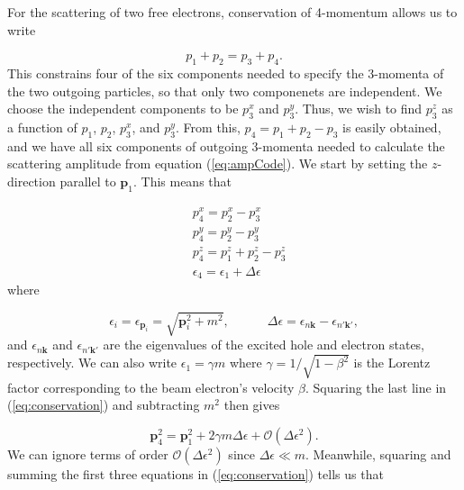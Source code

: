 \documentclass{article}
\begin{document}
For the scattering of two free electrons, conservation of 4-momentum allows us
to write

\begin{equation}
    p_1 + p_2 = p_3 + p_4.
\end{equation}
%
This constrains four of the six components needed to specify the 3-momenta of the
two outgoing particles, so that only two componenets are independent.
We choose the independent components to be $p^x_3$ and $p^y_3$.  Thus, we wish
to find $p^z_3$ as a function of $p_1$, $p_2$, $p^x_3$, and $p^y_3$.
From this, $p_4 = p_1 + p_2 - p_3$ is easily obtained, and we have all six
components of outgoing 3-momenta needed to calculate the scattering amplitude
from equation (\ref{eq:ampCode}).
We start by setting the $z$-direction parallel to $\mathbf{p}_1$.
This means that

\begin{equation}
\label{eq:conservation}
    \begin{aligned}
        &p^x_4 = p^x_2 - p^x_3
        \\&p^y_4 = p^y_2 - p^y_3
        \\&p^z_4 = p^z_1 + p^z_2 - p^z_3
        \\&\epsilon_4 = \epsilon_1 + \Delta\epsilon
    \end{aligned}
\end{equation}
%
where

\begin{equation}
  \epsilon_i = \epsilon_{\mathbf{p}_i} = \sqrt{\mathbf{p}_i^2 + m^2},
  \qquad\quad
  \Delta\epsilon = \epsilon_{n\mathbf{k}} - \epsilon_{n'\mathbf{k'}},
\end{equation}
%
and $\epsilon_{n\mathbf{k}}$ and $\epsilon_{n'\mathbf{k'}}$ are the eigenvalues
of the excited hole and electron states, respectively.
We can also write $\epsilon_1 = \gamma m$ where $\gamma=1/\sqrt{1-\beta^2}$ is
the Lorentz factor corresponding to the beam electron's velocity $\beta$.
Squaring the last line in (\ref{eq:conservation}) and subtracting $m^2$ then
gives

\begin{equation}
  \mathbf{p}_4^2
  =
  \mathbf{p}_1^2 + 2\gamma m\Delta\epsilon + \mathcal{O}(\Delta\epsilon^2).
  \label{eq:p41}
\end{equation}
%
We can ignore terms of order $\mathcal{O}(\Delta\epsilon^2)$ since
$\Delta\epsilon\ll m$.  Meanwhile, squaring and summing the first three
equations in (\ref{eq:conservation}) tells us that
\end{document}
